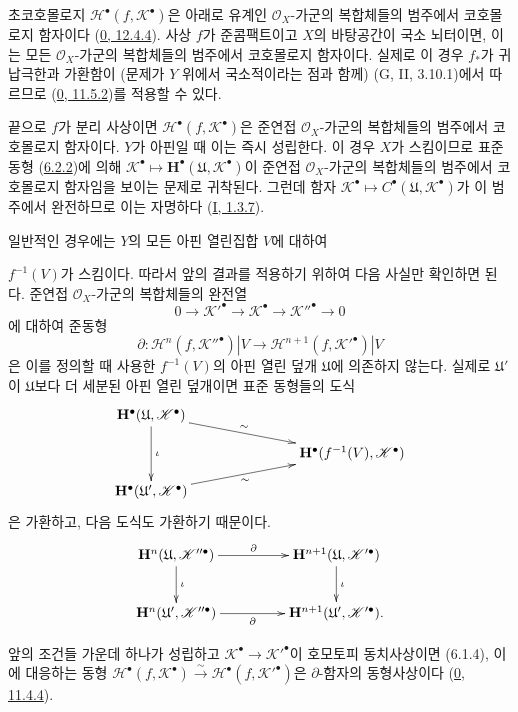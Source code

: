\begin{env}[6.2.6]
\label{III.6.2.6-fr}
초코호몰로지 $\mathscr H^\bullet(f,\mathscr K^\bullet)$은 아래로 유계인
$\mathscr O_X$-가군의 복합체들의 범주에서 코호몰로지 함자이다
(\hyperref[0.12.4.4-fr]{0, 12.4.4}). 사상 $f$가 준콤팩트이고
$X$의 바탕공간이 국소 뇌터이면, 이는 모든 $\mathscr O_X$-가군의
복합체들의 범주에서 코호몰로지 함자이다. 실제로 이 경우 $f_*$가
귀납극한과 가환함이 (문제가 $Y$ 위에서 국소적이라는 점과 함께)
(G, II, 3.10.1)에서 따르므로
(\hyperref[0.11.5.2-ko]{0, 11.5.2})를 적용할 수 있다.

끝으로 $f$가 분리 사상이면
$\mathscr H^\bullet(f,\mathscr K^\bullet)$은 준연접
$\mathscr O_X$-가군의 복합체들의 범주에서 코호몰로지 함자이다.
$Y$가 아핀일 때 이는 즉시 성립한다. 이 경우 $X$가 스킴이므로 표준 동형
(\hyperref[III.6.2.2-fr]{6.2.2})에 의해
$\mathscr K^\bullet\mapsto
\mathbf H^\bullet(\mathfrak U,\mathscr K^\bullet)$이 준연접
$\mathscr O_X$-가군의 복합체들의 범주에서 코호몰로지 함자임을 보이는
문제로 귀착된다. 그런데 함자
$\mathscr K^\bullet\mapsto
C^\bullet(\mathfrak U,\mathscr K^\bullet)$가 이 범주에서 완전하므로
이는 자명하다 (\hyperref[I.1.3.7-ko]{I, 1.3.7}).

일반적인 경우에는 $Y$의 모든 아핀 열린집합 $V$에 대하여


$f^{-1}(V)$가 스킴이다. 따라서 앞의 결과를 적용하기 위하여 다음
사실만 확인하면 된다. 준연접 $\mathscr O_X$-가군의 복합체들의 완전열
\[
  0\longrightarrow\mathscr K'^\bullet
  \longrightarrow\mathscr K^\bullet
  \longrightarrow\mathscr K''^\bullet
  \longrightarrow0
\]
에 대하여 준동형
\[
  \partial:
  \mathscr H^n(f,\mathscr K''^\bullet)|V
  \longrightarrow
  \mathscr H^{n+1}(f,\mathscr K'^\bullet)|V
\]
은 이를 정의할 때 사용한 $f^{-1}(V)$의 아핀 열린 덮개
$\mathfrak U$에 의존하지 않는다. 실제로 $\mathfrak U'$이
$\mathfrak U$보다 더 세분된 아핀 열린 덮개이면 표준 동형들의 도식
\[
  \xymatrix@C=34pt@R=11pt{
    \mathbf H^\bullet(\mathfrak U,\mathscr K^\bullet)
      \ar[rrd]^-{\sim}\ar[dd]^{\iota}
    && \\
    &&
    \mathbf H^\bullet(f^{-1}(V),\mathscr K^\bullet)
    \\
    \mathbf H^\bullet(\mathfrak U',\mathscr K^\bullet)
      \ar[rru]_-{\sim}
    &&
  }
\]
은 가환하고, 다음 도식도 가환하기 때문이다.
\[
  \xymatrix@C=46pt@R=25pt{
    \mathbf H^n(\mathfrak U,\mathscr K''^\bullet)
      \ar[r]^-{\partial}\ar[d]^{\iota}
    &
    \mathbf H^{n+1}(\mathfrak U,\mathscr K'^\bullet)
      \ar[d]^{\iota}
    \\
    \mathbf H^n(\mathfrak U',\mathscr K''^\bullet)
      \ar[r]_-{\partial}
    &
    \mathbf H^{n+1}(\mathfrak U',\mathscr K'^\bullet).
  }
\]

앞의 조건들 가운데 하나가 성립하고
$\mathscr K^\bullet\to\mathscr K'^\bullet$이 호모토피 동치사상이면
(6.1.4), 이에 대응하는 동형
$\mathscr H^\bullet(f,\mathscr K^\bullet)\xrightarrow{\sim}
\mathscr H^\bullet(f,\mathscr K'^\bullet)$은
$\partial$-함자의 동형사상이다
(\hyperref[0.11.4.4-fr]{0, 11.4.4}).
\end{env}

